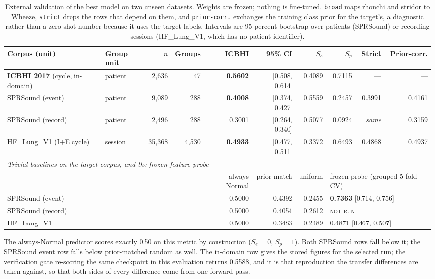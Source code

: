\documentclass[journal,onecolumn]{IEEEtran}
\newcommand{\best}[1]{\textbf{#1}}
\newcommand{\notrun}{\textsc{not run}}
\newif\ifshownew
\newcommand{\added}[1]{\ifshownew\ul{#1}\else#1\fi}
\begin{document}
\begin{table}[hbtp]
\centering
\caption{\added{External validation of the best model on two unseen datasets. Weights are
frozen; nothing is fine-tuned. \texttt{broad} maps rhonchi and stridor to Wheeze,
\texttt{strict} drops the rows that depend on them, and \texttt{prior-corr.} exchanges the
training class prior for the target's, a diagnostic rather than a zero-shot number because it
uses the target labels. Intervals are 95 percent bootstrap over patients (SPRSound) or
recording sessions (HF\_Lung\_V1, which has no patient identifier).}}
\label{tab:external}
\footnotesize
\begin{tabular}{llrrrrrrrr}
\toprule
Corpus (unit) & Group unit & $n$ & Groups & ICBHI & 95\% CI & $S_e$ & $S_p$ & Strict & Prior-corr. \\
\midrule
\best{ICBHI 2017} (cycle, in-domain) & patient & 2,636 & 47 & \best{0.5602} & [0.508, 0.614] & 0.4089 & 0.7115 & --- & --- \\
\midrule
SPRSound (event) & patient & 9,089 & 288 & \best{0.4008} & [0.374, 0.427] & 0.5559 & 0.2457 & 0.3991 & 0.4161 \\
SPRSound (record) & patient & 2,496 & 288 & 0.3001 & [0.264, 0.340] & 0.5077 & 0.0924 & \emph{same} & 0.3159 \\
HF\_Lung\_V1 (I$+$E cycle) & session & 35,368 & 4,530 & \best{0.4933} & [0.477, 0.511] & 0.3372 & 0.6493 & 0.4868 & 0.4937 \\
\midrule
\multicolumn{10}{l}{\emph{Trivial baselines on the target corpus, and the frozen-feature probe}}\\
\midrule
& & & & always Normal & prior-match & uniform & \multicolumn{3}{l}{frozen probe (grouped 5-fold CV)} \\
SPRSound (event) & & & & 0.5000 & 0.4392 & 0.2455 & \multicolumn{3}{l}{\best{0.7363} [0.714, 0.756]} \\
SPRSound (record) & & & & 0.5000 & 0.4054 & 0.2612 & \multicolumn{3}{l}{\notrun} \\
HF\_Lung\_V1 & & & & 0.5000 & 0.3483 & 0.2489 & \multicolumn{3}{l}{0.4871 [0.467, 0.507]} \\
\bottomrule
\end{tabular}

\vspace{2pt}
\footnotesize The always-Normal predictor scores exactly 0.50 on this metric by construction
($S_e=0$, $S_p=1$). Both SPRSound rows fall below it; the SPRSound event row falls below
prior-matched random as well. The in-domain row gives the stored figures for the selected run;
the verification gate re-scoring the same checkpoint in this evaluation returns 0.5588, and it
is that reproduction the transfer differences are taken against, so that both sides of every
difference come from one forward pass.
\end{table}
\end{document}
